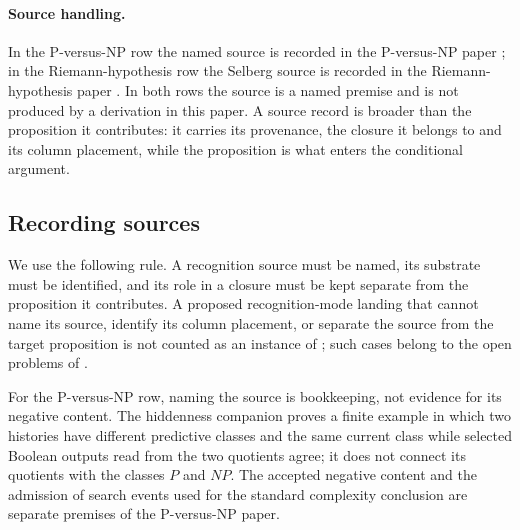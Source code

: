 \paragraph{Source handling.}  In the P-versus-NP row the named source
is
recorded in the P-versus-NP paper \cite{Tsiokos2026PvNP}; in the
Riemann-hypothesis row the Selberg source is recorded in the
Riemann-hypothesis paper \cite{Tsiokos2026RH}.  In both rows the source is a named
premise and is not produced by a derivation in this paper.  A source
record is broader than the proposition it contributes: it carries its
provenance, the closure it belongs to and its column placement, while
the proposition is what enters the conditional argument.

\subsection{Recording sources}\label{sec:audit:source-record-discipline}

We use the following rule.  A recognition source must be named, its
substrate must be identified, and its role in a closure must be kept
separate from the proposition it contributes.  A proposed
recognition-mode landing that cannot name its source, identify its
column placement, or separate the source from the target proposition is
not counted as an instance of ; such
cases belong to the open problems of .

For the P-versus-NP row, naming the source is bookkeeping, not
evidence for its negative content.  The hiddenness companion proves a
finite example in which two histories have different predictive classes
and the same current class while selected Boolean outputs read from the
two quotients agree; it does not connect its quotients with the classes
\(P\) and \(NP\).  The accepted negative content and the admission of
search events used for the standard complexity conclusion are separate
premises of the P-versus-NP paper.
